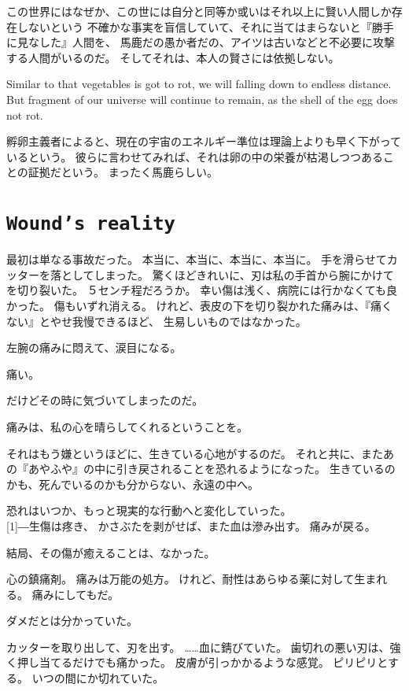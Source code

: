 \documentclass[autodetect-engine,dvipdfmx-if-dvi,a5paper,ja=standard,twoside,titlepage,final,twocolumn]{ltjtbook}
\begin{document}
この世界にはなぜか、この世には自分と同等か或いはそれ以上に賢い人間しか存在しないという
不確かな事実を盲信していて、それに当てはまらないと『勝手に見なした』人間を、
馬鹿だの愚か者だの、アイツは古いなどと不必要に攻撃する人間がいるのだ。
そしてそれは、本人の賢さには依拠しない。

Similar to that vegetables is got to rot, we will falling down to endless distance.
But fragment of our universe will continue to remain, as the shell of the egg does not rot.

孵卵主義者によると、現在の宇宙のエネルギー準位は理論上よりも早く下がっているという。
彼らに言わせてみれば、それは卵の中の栄養が枯渇しつつあることの証拠だという。
まったく馬鹿らしい。

\section*{\tt Wound's reality}
最初は単なる事故だった。
本当に、本当に、本当に、本当に。
手を滑らせてカッターを落としてしまった。
驚くほどきれいに、刃は私の手首から腕にかけてを切り裂いた。
５センチ程だろうか。
幸い傷は浅く、病院には行かなくても良かった。
傷もいずれ消える。
けれど、表皮の下を切り裂かれた痛みは、『痛くない』とやせ我慢できるほど、
生易しいものではなかった。

左腕の痛みに悶えて、涙目になる。

痛い。

だけどその時に気づいてしまったのだ。

痛みは、私の心を晴らしてくれるということを。

それはもう嫌というほどに、生きている心地がするのだ。
それと共に、またあの『あやふや』の中に引き戻されることを恐れるようになった。
生きているのかも、死んでいるのかも分からない、永遠の中へ。

恐れはいつか、もっと現実的な行動へと変化していった。\\

\scalebox{3}[1]{―}生傷は疼き、
かさぶたを剥がせば、また血は滲み出す。
痛みが戻る。

結局、その傷が癒えることは、なかった。

心の鎮痛剤。
痛みは万能の処方。
けれど、耐性はあらゆる薬に対して生まれる。
痛みにしてもだ。

ダメだとは分かっていた。

カッターを取り出して、刃を出す。
……血に錆びていた。
歯切れの悪い刃は、強く押し当てるだけでも痛かった。
皮膚が引っかかるような感覚。
ピリピリとする。
いつの間にか切れていた。
\end{document}
